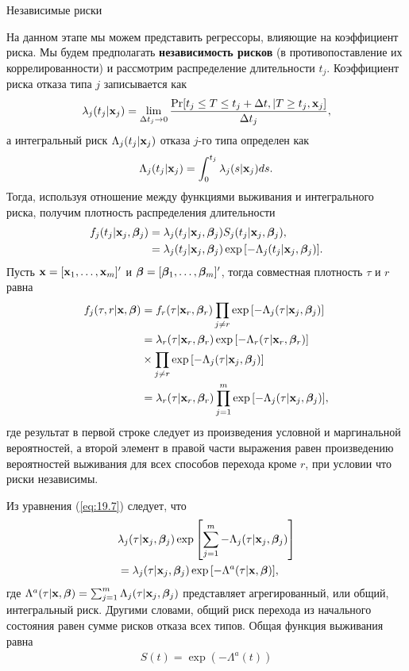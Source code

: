         \begin{center}Независимые риски\end{center}
        \noindent
На данном этапе мы можем представить регрессоры, влияющие на коэффициент риска. Мы будем предполагать \textbf{независимость рисков} (в противопоставление их коррелированности) и рассмотрим распределение длительности $t_j$. Коэффициент риска отказа типа $j$ записывается как
    \begin{align}
    \lambda_j(t_j|\mathbf{x}_j) = \lim_{\Delta t_j \rightarrow 0} \frac{\mathrm{Pr} [t_j \le T \le t_j + \Delta t, | T \ge t_j, \mathbf{x}_j]}{\Delta t_j}, \notag
    \end{align}
а интегральный риск $\Lambda_j(t_j|\mathbf{x}_j)$ отказа $j$-го типа определен как
    \begin{align}
    \Lambda_j(t_j|\mathbf{x}_j) = \int_{0}^{t_j} \lambda_j(s|\mathbf{x}_j)ds. \notag
    \end{align}
Тогда, используя отношение между функциями выживания и интегрального риска, получим плотность распределения длительности
    \begin{align}
    f_j(t_j|\mathbf{x}_j, \bm{\beta}_j)    &= \lambda_j(t_j|\mathbf{x}_j, \bm{\beta}_j) S_j(t_j|\mathbf{x}_j, \bm{\beta}_j), \notag \\
                            &= \lambda_j(t_j|\mathbf{x}_j, \bm{\beta}_j) \exp{[-\Lambda_j(t_j|\mathbf{x}_j, \bm{\beta}_j)]}. \notag
    \end{align}
Пусть $\mathbf{x} = [\mathbf{x}_1, \ldots , \mathbf{x}_m]'$ и $\bm{\beta} = [\bm{\beta}_1, \ldots , \bm{\beta}_m]'$, тогда совместная плотность $\tau$ и $r$ равна
    \begin{align}
    \label{eq:19.7}
    f_j(\tau,r|\mathbf{x},\bm{\beta})  &= f_r(\tau|\mathbf{x}_r,\bm{\beta}_r) \prod_{j \ne r} \exp{[- \Lambda_j(\tau |\mathbf{x}_j,\bm{\beta}_j)]} \\
                        &= \lambda_r(\tau|\mathbf{x}_r,\bm{\beta}_r) \exp{[-\Lambda_r(\tau|\mathbf{x}_r,\bm{\beta}_r)]} \notag \\
                        &  \times \prod_{j \ne r} \exp{[-\Lambda_j(\tau|\mathbf{x}_j,\bm{\beta}_j)]} \notag \\
                        &= \lambda_r(\tau|\mathbf{x}_r,\bm{\beta}_r) \prod_{j = 1}^{m} \exp{[-\Lambda_j(\tau|\mathbf{x}_j,\bm{\beta}_j)]}, \notag
    \end{align}
где результат в первой строке следует из произведения условной и маргинальной вероятностей, а второй элемент в правой части выражения равен произведению вероятностей выживания для всех способов перехода кроме $r$, при условии что риски независимы.

Из уравнения (\ref{eq:19.7}) следует, что
    \begin{align}
    \label{eq:19.8}
    & \lambda_j(\tau|\mathbf{x}_j,\bm{\beta}_j) \exp{\left[\sum_{j=1}^{m} - \Lambda_j(\tau|\mathbf{x}_j,\bm{\beta}_j) \right]} \\
    &= \lambda_j(\tau|\mathbf{x}_j,\bm{\beta}_j) \exp{[- \Lambda^a (\tau|\mathbf{x},\bm{\beta})]}, \notag
    \end{align}
где $\Lambda^a (\tau|\mathbf{x},\bm{\beta}) = \sum_{j=1}^{m} \Lambda_j(\tau|\mathbf{x}_j,\bm{\beta}_j)$ представляет агрегированный, или общий, интегральный риск. Другими словами, общий риск перехода из начального состояния равен сумме рисков отказа всех типов. Общая функция выживания равна
    \begin{align}
    \label{eq:19.9}
    S(t) = \exp{(-\Lambda^a (t))}
    \end{align}

